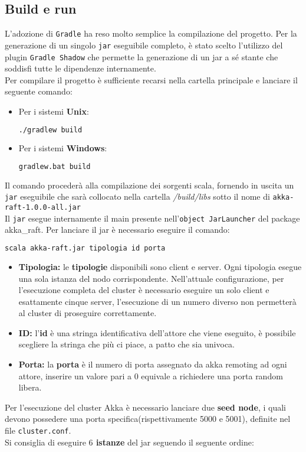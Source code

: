  	\subsection{Build e run}
	 	L'adozione di \texttt{Gradle} ha reso molto semplice la compilazione del progetto.
	 	Per la generazione di un singolo \texttt{jar} eseguibile completo, è stato scelto l'utilizzo del plugin \texttt{Gradle Shadow} \cite{GradleShadowSite} che permette la generazione di un jar a sé stante che soddisfi tutte le dipendenze internamente.\\
	 	Per compilare il progetto è sufficiente recarsi nella cartella principale e lanciare il seguente comando:
	 	\begin{itemize}
	 		\item Per i sistemi \textbf{Unix}: 
	 			\begin{lstlisting}[language=bash]
./gradlew build
	 			\end{lstlisting}
	 		\item Per i sistemi \textbf{Windows}: 
	 			\begin{lstlisting}[language=bash]
gradlew.bat build
	 			\end{lstlisting} 
	 	\end{itemize}
		Il comando procederà alla compilazione dei sorgenti scala, fornendo in uscita un \texttt{jar} eseguibile che sarà collocato nella cartella \emph{/build/libs} sotto il nome di \texttt{akka-raft-1.0.0-all.jar}\\
		Il \texttt{jar} esegue internamente il main presente nell'\texttt{object JarLauncher} del package akka\_raft.
	  Per lanciare il jar è necessario eseguire il comando:

	 \begin{lstlisting}[language=bash]
		scala akka-raft.jar tipologia id porta
	 \end{lstlisting}
 
    \begin{itemize}
      \item{\textbf{Tipologia:}} le \textbf{tipologie} disponibili sono client e server. Ogni tipologia esegue una sola istanza del nodo corrispondente.
      Nell'attuale configurazione, per l'esecuzione completa del cluster è necessario eseguire un solo client e esattamente cinque server, l'esecuzione di un numero diverso non permetterà al cluster di proseguire correttamente.
      \item{\textbf{ID:}}
 			l'\textbf{id} è una stringa identificativa dell'attore che viene eseguito, è possibile scegliere la stringa che più ci piace, a patto che sia univoca.
      \item{\textbf{Porta:}}
      la \textbf{porta} è il numero di porta assegnato da akka remoting ad ogni attore, inserire un valore pari a $0$ equivale a richiedere una porta random libera.
    \end{itemize}
		Per l'esecuzione del cluster Akka è necessario lanciare due \textbf{seed node}, i quali devono possedere una porta specifica(rispettivamente 5000 e 5001), definite nel file \texttt{cluster.conf}.\\
		Si consiglia di eseguire \textbf{$6$ istanze} del jar seguendo il seguente ordine:
		
